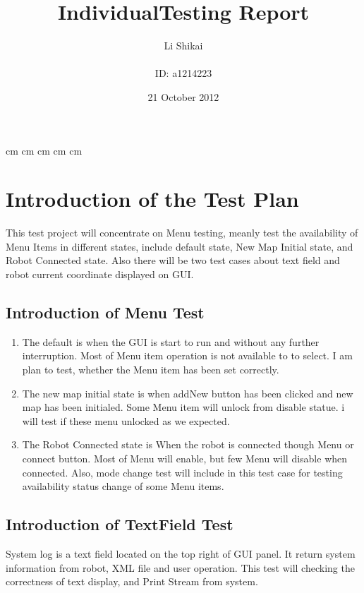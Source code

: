 \documentclass[11pt, a4paper]{report}
\begin{document}
\title{\Huge IndividualTesting Report }
\author{Li Shikai\\ \\ID: a1214223}
\date{21 October 2012}
\maketitle
\pagebreak
{} cm
 cm
 cm
 cm
 cm
\tableofcontents

\chapter{Introduction of the Test Plan}
This test project will concentrate on Menu testing, meanly test the availability of Menu Items in different states, include default state, New Map Initial state, and Robot Connected state. Also there will be two test cases about text field and robot current coordinate displayed on GUI.
\section{Introduction of Menu Test}
\begin{enumerate}
\item The default is when the GUI is start to run and without any further interruption. Most of Menu item operation is not available to to select. I am plan to test, whether the Menu item has been set correctly.
\item The new map initial state is when addNew button has been clicked and new map has been initialed. Some Menu item will unlock from disable statue. i will test if these menu unlocked as we expected.
\item The Robot Connected state is When the robot is connected though Menu or connect button. Most of Menu will enable, but few Menu will disable when connected. Also, mode change test will include in this test case for testing availability status change of some Menu items.
\end{enumerate}
\section{Introduction of TextField Test}
System log is a text field located on the top right of GUI panel. It return system information from robot, XML file and user operation. This test will checking the correctness of text display, and Print Stream from system.
\end{document}
